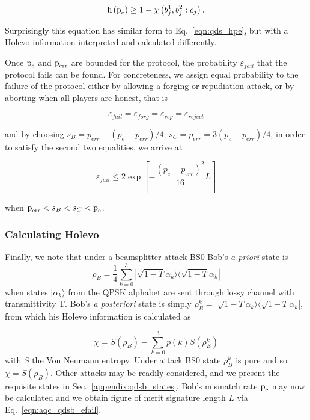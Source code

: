 \begin{equation}
\text{h}\left(\text{p}_{\text{e}}\right) \ge 1 - \chi\left(b_j^1, b_j^2 : c_j\right).
\end{equation}

\noindent Surprisingly this equation has similar form to Eq.~\ref{eqn:qds_hpe}, but with a Holevo information interpreted and calculated differently. %


Once $\text{p}_{\text{e}}$ and $\text{p}_{\text{err}}$ are bounded for the protocol, the probability $\varepsilon_{fail}$ that the protocol fails can be found. For concreteness, we assign equal probability to the failure of the protocol either by allowing a forging or repudiation attack, or by aborting when all players are honest, that is

\begin{equation*}
\varepsilon_{fail} = \varepsilon_{forg} = \varepsilon_{rep} = \varepsilon_{reject}
\end{equation*}

\noindent and by choosing $s_B = p_{err} + \left(p_e + p_{err}\right)/4$; $s_C = p_{err} = 3\left(p_e - p_{err}\right)/4$, in order to satisfy the second two equalities, we arrive at 

\begin{equation}\label{eqn:aqc_qdsb_efail}
\varepsilon_{fail} \le 2 \exp \left[ - \frac{\left( p_e - p_{err} \right)^2}{16} L \right]
\end{equation}

\noindent when $\text{p}_{\text{err}}< s_B < s_C < \text{p}_{\text{e}}$.

\subsubsection{Calculating Holevo}

Finally, we note that under a beamsplitter attack BS$0$ Bob's \emph{a priori} state is
\begin{equation}\label{eqn:qdsb_apriori_state}
\rho_B = \frac{1}{4}\sum_{k=0}^3 |\sqrt{1-T}\alpha_k\rangle\langle\sqrt{1-T}\alpha_k|
\end{equation}
when states $|\alpha_k\rangle$ from the QPSK alphabet are sent through lossy channel with transmittivity T. Bob's \emph{a posteriori} state is simply $\rho_{B}^k = |\sqrt{1-T}\alpha_k\rangle\langle \sqrt{1-T}\alpha_k|$, from which his Holevo information is calculated as

\begin{equation}
\chi = S\left(\rho_B\right) - \sum_{k=0}^3 p\left(k\right) S\left(\rho_E^k\right)
\end{equation}
with $S$ the Von Neumann entropy. Under attack BS$0$ state $\rho_B^k$ is pure and so $\chi = S\left(\rho_B\right)$. Other attacks may be readily considered, and we present the requisite states in Sec.~\ref{appendix:qdsb_states}. %
Bob's mismatch rate $\text{p}_{\text{e}}$ may now be calculated and we obtain figure of merit signature length $L$ via Eq.~\ref{eqn:aqc_qdsb_efail}.



